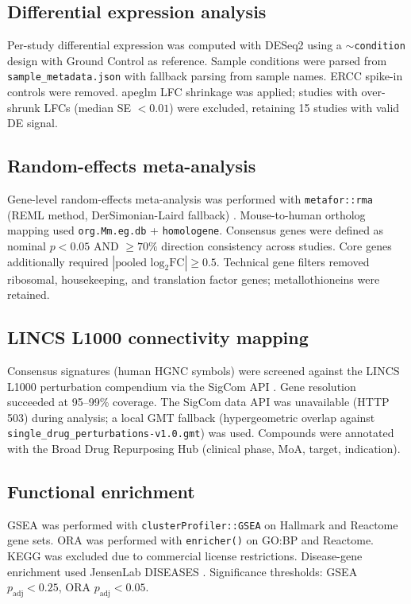 \documentclass[11pt,a4paper]{article}
\begin{document}
\subsection{Differential expression analysis}
Per-study differential expression was computed with DESeq2 \citep{love2014deseq2} using a 
$\sim$\texttt{condition} design with Ground Control as reference. Sample conditions were parsed from 
\texttt{sample\_metadata.json} with fallback parsing from sample names. ERCC spike-in controls were 
removed. apeglm LFC shrinkage \citep{zhu2019apeglm} was applied; studies with over-shrunk LFCs 
(median SE $< 0.01$) were excluded, retaining 15 studies with valid DE signal.

\subsection{Random-effects meta-analysis}
Gene-level random-effects meta-analysis was performed with \texttt{metafor::rma} (REML method, 
DerSimonian-Laird fallback) \citep{viechtbauer2010metafor}. Mouse-to-human ortholog mapping used 
\texttt{org.Mm.eg.db} + \texttt{homologene}. Consensus genes were defined as nominal $p < 0.05$ 
AND $\geq 70\%$ direction consistency across studies. Core genes additionally required 
$|\text{pooled log}_2\text{FC}| \geq 0.5$. Technical gene filters removed ribosomal, housekeeping, 
and translation factor genes; metallothioneins were retained.

\subsection{LINCS L1000 connectivity mapping}
Consensus signatures (human HGNC symbols) were screened against the LINCS L1000 perturbation 
compendium via the SigCom API \citep{subramanian2017next}. Gene resolution succeeded at 95--99\% 
coverage. The SigCom data API was unavailable (HTTP 503) during analysis; a local GMT fallback 
(hypergeometric overlap against \texttt{single\_drug\_perturbations-v1.0.gmt}) was used. Compounds 
were annotated with the Broad Drug Repurposing Hub (clinical phase, MoA, target, indication).

\subsection{Functional enrichment}
GSEA was performed with \texttt{clusterProfiler::GSEA} \citep{yu2012clusterprofiler} on Hallmark 
\citep{liberzon2015hallmark} and Reactome gene sets. ORA was performed with \texttt{enricher()} on 
GO:BP and Reactome. KEGG was excluded due to commercial license restrictions. Disease-gene enrichment 
used JensenLab DISEASES \citep{jensen2016diseases}. Significance thresholds: GSEA $p_{\text{adj}} < 0.25$, 
ORA $p_{\text{adj}} < 0.05$.
\end{document}
